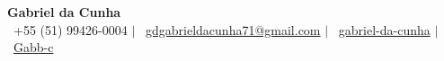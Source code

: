 \begin{center}
  \textbf{\Huge Gabriel da Cunha} \\ \vspace{4pt}
  \small
  \faPhone\ +55 (51) 99426-0004 $|$
  \faEnvelope\ \href{mailto:gdgabrieldacunha71@gmail.com}{gdgabrieldacunha71@gmail.com} $|$
  \faLinkedin\ \href{https://www.linkedin.com/in/gabriel-da-cunha/}{gabriel-da-cunha} $|$
  \faGithub\ \href{https://github.com/Gabb-c}{Gabb-c}
\end{center}